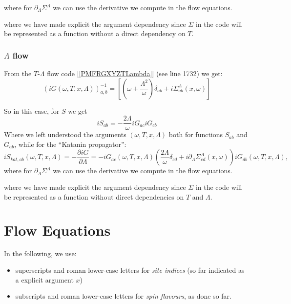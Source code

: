 \documentclass{article}
\begin{document}
where for $\partial_\Lambda \Sigma^\Lambda$ we can use the derivative we compute in the flow equations.



where we have made explicit the argument dependency
since $\Sigma$ in the code will be represented as a function
without a direct dependency on $T$.

\subsubsection{$\Lambda$ flow}

From the $T$-$\Lambda$ flow code [\ref{PMFRGXYZTLambda}] (see line 1732) we get:
\begin{equation}
  {(iG(\omega,T,x,\Lambda))}^{-1}_{a,b} = \left[\left(\omega+\frac{\Lambda^2}{\omega}\right) \delta_{ab} + i \Sigma^\Lambda_{ab}(x,\omega)\right]
\end{equation}

So in this case, for $S$ we get
\begin{equation}
iS_{ab} = - \frac{2\Lambda}{\omega} iG_{ac} iG_{cb}
\end{equation}
Where we left understood the arguments $(\omega,T,x,\Lambda)$ both for functions $S_{ab}$ and $G_{ab}$, while for the ``Katanin propagator'':
\begin{equation}
  iS_{kat,ab}(\omega,T,x,\Lambda) = - \frac{\partial iG}{\partial \Lambda} = - iG_{ac} (\omega,T,x,\Lambda)\left( \frac{2\Lambda}{\omega}\delta_{cd}  +i \partial_\Lambda \Sigma_{cd}^\Lambda(x,\omega)\right)iG_{db}(\omega,T,x,\Lambda),
\end{equation}
where for $\partial_\Lambda \Sigma^\Lambda$ we can use the derivative we compute in the flow equations.

where we have made explicit the argument dependency
since $\Sigma$ in the code will be represented as a function
without direct dependencies on $T$ and $\Lambda$.


\section{Flow Equations}

In the following, we use:
\begin{itemize}
\item superscripts and roman lower-case letters for \emph{site indices}
  (so far indicated as a explicit argument $x$)
\item subscripts and roman lower-case letters for \emph{spin flavours},
  as done so far.

\end{itemize}
\end{document}
